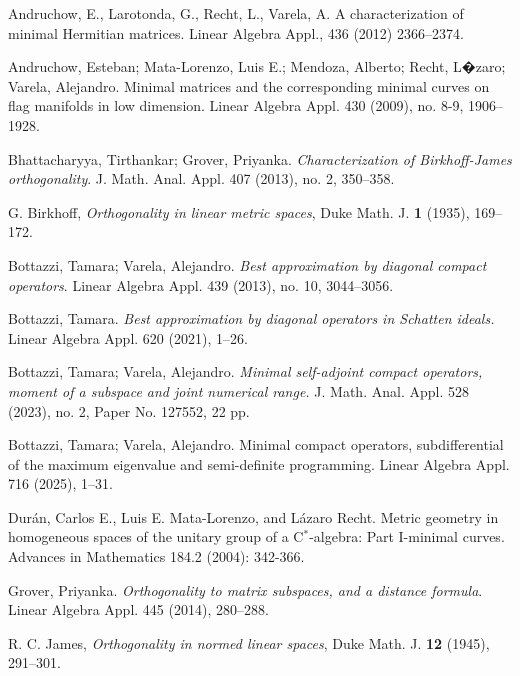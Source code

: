 \documentclass[12pt,a4paper]{article}
\numberwithin{equation}{section}
\begin{document}
\begin{thebibliography}{}


Andruchow, E., Larotonda, G., Recht, L., Varela, A.  
A characterization of minimal Hermitian matrices. Linear Algebra Appl., 436 (2012) 2366--2374.


 Andruchow, Esteban; Mata-Lorenzo, Luis E.; Mendoza, Alberto; Recht, L�zaro; Varela, Alejandro. Minimal matrices and the corresponding minimal curves on flag manifolds in low dimension. Linear Algebra Appl. 430 (2009), no. 8-9, 1906--1928.

 Bhattacharyya, Tirthankar; Grover, Priyanka. \textit{Characterization of Birkhoff-James orthogonality}. J. Math. Anal. Appl. 407 (2013), no. 2, 350--358.

 G. Birkhoff, \textit{Orthogonality in linear metric spaces}, Duke Math. J. \textbf{1} (1935), 169--172.

 Bottazzi, Tamara; Varela, Alejandro. \textit{Best approximation by diagonal compact operators}. Linear Algebra Appl. 439 (2013), no. 10, 3044--3056.

 Bottazzi, Tamara. \textit{Best approximation by diagonal operators in Schatten ideals.} Linear Algebra Appl. 620 (2021), 1--26.

 Bottazzi, Tamara; Varela, Alejandro. \textit{Minimal self-adjoint compact operators, moment of a subspace and joint numerical range.} J. Math. Anal. Appl. 528 (2023), no. 2, Paper No. 127552, 22 pp.

 Bottazzi, Tamara; Varela, Alejandro. Minimal compact operators, subdifferential of the maximum eigenvalue and semi-definite programming. Linear Algebra Appl. 716 (2025), 1--31.

 Dur\'an, Carlos E., Luis E. Mata-Lorenzo, and L\'azaro Recht. Metric geometry in homogeneous spaces of the unitary group of a C$^*$-algebra: Part I-minimal curves. Advances in Mathematics 184.2 (2004): 342-366.

 Grover, Priyanka.\textit{ Orthogonality to matrix subspaces, and a distance formula}. Linear Algebra Appl. 445 (2014), 280--288. 

 R. C. James, \textit{Orthogonality in normed linear spaces}, Duke Math. J. \textbf{12} (1945), 291--301.



\end{thebibliography}
\end{document}
